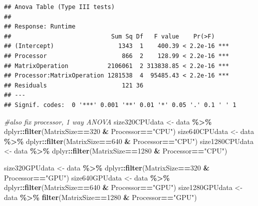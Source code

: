 \documentclass[
]{article}
\newenvironment{Shaded}{\begin{snugshade}}{\end{snugshade}}
\newcommand{\CommentTok}[1]{\textcolor[rgb]{0.56,0.35,0.01}{\textit{#1}}}
\newcommand{\DecValTok}[1]{\textcolor[rgb]{0.00,0.00,0.81}{#1}}
\newcommand{\KeywordTok}[1]{\textcolor[rgb]{0.13,0.29,0.53}{\textbf{#1}}}
\newcommand{\NormalTok}[1]{#1}
\newcommand{\OperatorTok}[1]{\textcolor[rgb]{0.81,0.36,0.00}{\textbf{#1}}}
\newcommand{\StringTok}[1]{\textcolor[rgb]{0.31,0.60,0.02}{#1}}
\begin{document}
\begin{verbatim}
## Anova Table (Type III tests)
## 
## Response: Runtime
##                            Sum Sq Df   F value    Pr(>F)    
## (Intercept)                  1343  1    400.39 < 2.2e-16 ***
## Processor                     866  2    128.99 < 2.2e-16 ***
## MatrixOperation           2106061  2 313838.85 < 2.2e-16 ***
## Processor:MatrixOperation 1281538  4  95485.43 < 2.2e-16 ***
## Residuals                     121 36                        
## ---
## Signif. codes:  0 '***' 0.001 '**' 0.01 '*' 0.05 '.' 0.1 ' ' 1
\end{verbatim}

\begin{Shaded}
\begin{Highlighting}[]
\CommentTok{\#also fix processor, 1 way ANOVA}
\NormalTok{size320CPUdata \textless{}{-}}\StringTok{ }\NormalTok{data }\OperatorTok{\%\textgreater{}\%}\StringTok{ }\NormalTok{dplyr}\OperatorTok{::}\KeywordTok{filter}\NormalTok{(MatrixSize}\OperatorTok{==}\DecValTok{320} \OperatorTok{\&}\StringTok{ }\NormalTok{Processor}\OperatorTok{==}\StringTok{"CPU"}\NormalTok{)}
\NormalTok{size640CPUdata \textless{}{-}}\StringTok{ }\NormalTok{data }\OperatorTok{\%\textgreater{}\%}\StringTok{ }\NormalTok{dplyr}\OperatorTok{::}\KeywordTok{filter}\NormalTok{(MatrixSize}\OperatorTok{==}\DecValTok{640} \OperatorTok{\&}\StringTok{ }\NormalTok{Processor}\OperatorTok{==}\StringTok{"CPU"}\NormalTok{)}
\NormalTok{size1280CPUdata \textless{}{-}}\StringTok{ }\NormalTok{data }\OperatorTok{\%\textgreater{}\%}\StringTok{ }\NormalTok{dplyr}\OperatorTok{::}\KeywordTok{filter}\NormalTok{(MatrixSize}\OperatorTok{==}\DecValTok{1280} \OperatorTok{\&}\StringTok{ }\NormalTok{Processor}\OperatorTok{==}\StringTok{"CPU"}\NormalTok{)}

\NormalTok{size320GPUdata \textless{}{-}}\StringTok{ }\NormalTok{data }\OperatorTok{\%\textgreater{}\%}\StringTok{ }\NormalTok{dplyr}\OperatorTok{::}\KeywordTok{filter}\NormalTok{(MatrixSize}\OperatorTok{==}\DecValTok{320} \OperatorTok{\&}\StringTok{ }\NormalTok{Processor}\OperatorTok{==}\StringTok{"GPU"}\NormalTok{)}
\NormalTok{size640GPUdata \textless{}{-}}\StringTok{ }\NormalTok{data }\OperatorTok{\%\textgreater{}\%}\StringTok{ }\NormalTok{dplyr}\OperatorTok{::}\KeywordTok{filter}\NormalTok{(MatrixSize}\OperatorTok{==}\DecValTok{640} \OperatorTok{\&}\StringTok{ }\NormalTok{Processor}\OperatorTok{==}\StringTok{"GPU"}\NormalTok{)}
\NormalTok{size1280GPUdata \textless{}{-}}\StringTok{ }\NormalTok{data }\OperatorTok{\%\textgreater{}\%}\StringTok{ }\KeywordTok{filter}\NormalTok{(MatrixSize}\OperatorTok{==}\DecValTok{1280} \OperatorTok{\&}\StringTok{ }\NormalTok{Processor}\OperatorTok{==}\StringTok{"GPU"}\NormalTok{)}


\end{Highlighting}
\end{Shaded}
\end{document}
